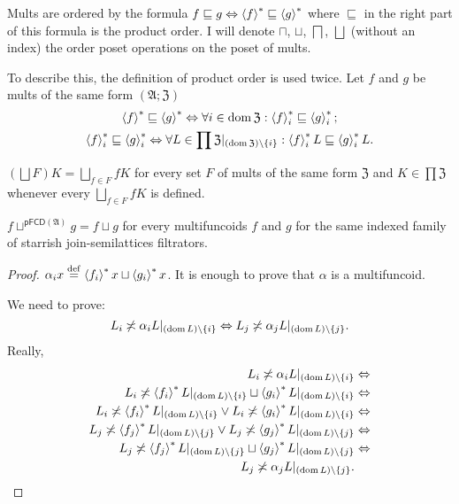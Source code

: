 Mults are ordered by the formula $f\sqsubseteq g\Leftrightarrow\left\langle f\right\rangle ^{\ast}\sqsubseteq\left\langle g\right\rangle ^{\ast}$
where $\sqsubseteq$ in the right part of this formula is the product
order. I will denote $\sqcap$, $\sqcup$, $\bigsqcap$, $\bigsqcup$
(without an index) the order poset operations on the poset of mults.
\begin{rem}
To describe this, the definition of product order is used twice. Let
$f$ and $g$ be mults of the same form $(\mathfrak{A};\mathfrak{Z})$
\begin{gather*}
\left\langle f\right\rangle ^{\ast}\sqsubseteq\left\langle g\right\rangle ^{\ast}\Leftrightarrow\forall i\in\operatorname{dom}\mathfrak{Z}:\left\langle f\right\rangle ^{\ast}_{i}\sqsubseteq\left\langle g\right\rangle ^{\ast}_{i};\\
\left\langle f\right\rangle ^{\ast}_{i}\sqsubseteq\left\langle g\right\rangle ^{\ast}_{i}\Leftrightarrow\forall L\in\prod\mathfrak{Z}|_{(\operatorname{dom}\mathfrak{Z})\setminus\{i\}}:\left\langle f\right\rangle ^{\ast}_{i}L\sqsubseteq\left\langle g\right\rangle ^{\ast}_{i}L.
\end{gather*}
\end{rem}
\begin{obvious}
$\left(\bigsqcup F\right)K=\bigsqcup_{f\in F}fK$ for every set $F$
of mults of the same form $\mathfrak{Z}$ and $K\in\prod\mathfrak{Z}$
whenever every $\bigsqcup_{f\in F}fK$ is defined.\end{obvious}
\begin{thm}
$f\sqcup^{\mathsf{pFCD}(\mathfrak{A})}g=f\sqcup g$ for every multifuncoids
$f$ and $g$ for the same indexed family of starrish join-semilattices
filtrators.\end{thm}
\begin{proof}
$\alpha_{i}x\overset{\mathrm{def}}{=} \left\langle f_{i}\right\rangle ^{\ast}x\sqcup \left\langle g_{i}\right\rangle ^{\ast}x$. It is enough to prove that
$\alpha$ is a multifuncoid.

We need to prove: 
\[
L_{i}\not\asymp\alpha_{i}L|_{(\operatorname{dom} L)\setminus\{i\}}\Leftrightarrow L_{j}\not\asymp\alpha_{j}L|_{(\operatorname{dom} L)\setminus\{j\}}.
\]
Really,
\begin{align*}
L_{i}\not\asymp\alpha_{i}L|_{(\operatorname{dom} L)\setminus\{i\}} & \Leftrightarrow\\
L_{i}\not\asymp \left\langle f_{i}\right\rangle ^{\ast}L|_{(\operatorname{dom} L)\setminus\{i\}}\sqcup \left\langle g_{i}\right\rangle ^{\ast}L|_{(\operatorname{dom} L)\setminus\{i\}} & \Leftrightarrow\\
L_{i}\not\asymp \left\langle f_{i}\right\rangle ^{\ast}L|_{(\operatorname{dom} L)\setminus\{i\}}\lor L_{i}\not\asymp \left\langle g_{i}\right\rangle ^{\ast}L|_{(\operatorname{dom} L)\setminus\{i\}} & \Leftrightarrow\\
L_{j}\not\asymp \left\langle f_{j}\right\rangle ^{\ast}L|_{(\operatorname{dom} L)\setminus\{j\}}\lor L_{j}\not\asymp \left\langle g_{j}\right\rangle ^{\ast}L|_{(\operatorname{dom} L)\setminus\{j\}} & \Leftrightarrow\\
L_{j}\not\asymp \left\langle f_{j}\right\rangle ^{\ast}L|_{(\operatorname{dom} L)\setminus\{j\}}\sqcup \left\langle g_{j}\right\rangle ^{\ast}L|_{(\operatorname{dom} L)\setminus\{j\}} & \Leftrightarrow\\
L_{j}\not\asymp\alpha_{j}L|_{(\operatorname{dom} L)\setminus\{j\}}.
\end{align*}
\end{proof}

